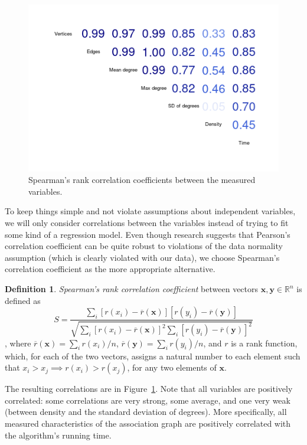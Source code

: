 \documentclass{l4proj}
\theoremstyle{definition}
\newtheorem{definition}{Definition}[chapter]
\theoremstyle{remark}
\begin{document}
\begin{figure}
  \centering
  \includegraphics[scale=0.5]{images/correlations.png}
  \caption{Spearman's rank correlation coefficients between the measured
    variables.}
  \label{fig:correlations}
\end{figure}

To keep things simple and not violate assumptions about independent variables,
we will only consider correlations between the variables instead of trying to
fit some kind of a regression model. Even though research suggests that
Pearson's correlation coefficient can be quite robust to violations of the data
normality assumption \cite{article} (which is clearly violated with our data),
we choose Spearman's correlation coefficient as the more appropriate
alternative.

\begin{definition}
  \emph{Spearman's rank correlation coefficient} \cite{mood1974introduction}
  between vectors $\bm{x}, \bm{y} \in \mathbb{R}^n$ is defined as
\[ S = \frac{\sum_i [r(x_i) - \overline{r}(\bm{x})][r(y_i) -
    \overline{r}(\bm{y})]}{\sqrt{\sum_i [r(x_i) -
      \overline{r}(\bm{x})]^2\sum_i [r(y_i) -
      \overline{r}(\bm{y})]^2}} \],
where $\overline{r}(\bm{x}) = \sum_i r(x_i)/n$, $\overline{r}(\bm{y})
= \sum_i r(y_i)/n$, and $r$ is a rank function, which, for each of the two
vectors, assigns a natural number to each element such that $x_i > x_j \implies
r(x_i) > r(x_j)$, for any two elements of $\bm{x}$.
\end{definition}

The resulting correlations are in Figure~\ref{fig:correlations}. Note that all
variables are positively correlated: some correlations are very strong, some
average, and one very weak (between density and the standard deviation of
degrees). More specifically, all measured characteristics of the association
graph are positively correlated with the algorithm's running time.
\end{document}
